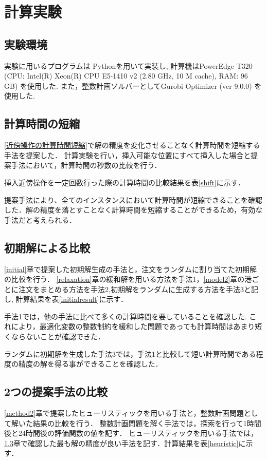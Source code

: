 \chapter{計算実験}\label{computational_result}
\section{実験環境}
実験に用いるプログラムは Pythonを用いて実装し, 計算機はPowerEdge T320 (CPU: Intel(R) Xeon(R) CPU E5-1410 v2 (2.80 GHz, 10 M cache), RAM: 96 GB) を使用した. また，整数計画ソルバーとしてGurobi Optimizer (ver 9.0.0) を使用した.

\section{計算時間の短縮}
\label{timecomparision}
\ref{近傍操作の計算時間短縮}で解の精度を変化させることなく計算時間を短縮する手法を提案した．
計算実験を行い，挿入可能な位置にすべて挿入した場合と提案手法において，計算時間の秒数の比較を行う．

挿入近傍操作を一定回数行った際の計算時間の比較結果を表\ref{shift}に示す．

提案手法により、全てのインスタンスにおいて計算時間が短縮できることを確認した．解の精度を落とすことなく計算時間を短縮することができるため，有効な手法だと考えられる．

\section{初期解による比較}
\label{sectioninitial}
\ref{initial}章で提案した初期解生成の手法と，注文をランダムに割り当てた初期解の比較を行う．
\ref{relaxation}章の緩和解を用いる方法を手法1，\ref{model2}章の港ごとに注文をまとめる方法を手法2,初期解をランダムに生成する方法を手法3と記し, 計算結果を表\ref{initialresult}に示す．

手法1では，他の手法に比べて多くの計算時間を要していることを確認した. これにより，最適化変数の整数制約を緩和した問題であっても計算時間はあまり短くならないことが確認できた．

ランダムに初期解を生成した手法3では，手法1と比較して短い計算時間である程度の精度の解を得る事ができることを確認した．


\section{2つの提案手法の比較}
\ref{method2}章で提案したヒューリスティックを用いる手法と，整数計画問題として解いた結果の比較を行う．
整数計画問題を解く手法では，探索を行って1時間後と24時間後の評価関数の値を記す．
ヒューリスティックを用いる手法では，\ref{sectioninitial}章で確認した最も解の精度が良い手法を記す．計算結果を表\ref{heuristic}に示す．

